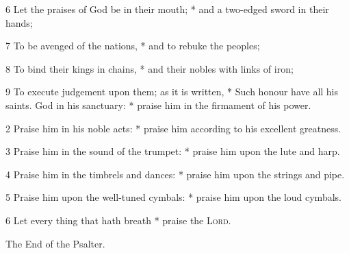 6 Let the praises of God be in their mouth; * and a two-edged sword in their hands;\par
7 To be avenged of the nations, * and to rebuke the peoples;\par
8 To bind their kings in chains, * and their nobles with links of iron;\par
9 To execute judgement upon them; as it is written, * Such honour have all his saints.
 God in his sanctuary: * praise him in the firmament of his power.\par
2 Praise him in his noble acts: * praise him according to his excellent greatness.\par
3 Praise him in the sound of the trumpet: * praise him upon the lute and harp.\par
4 Praise him in the timbrels and dances: * praise him upon the strings and pipe.\par
5 Praise him upon the well-tuned cymbals: * praise him upon the loud cymbals.\par
6 Let every thing that hath breath * praise the {\textsc{Lord}}.
\begin{center}
The End of the Psalter.
\end{center}